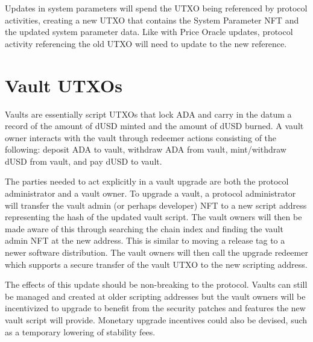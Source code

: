 \documentclass[12pt]{article}
\begin{document}
Updates in system parameters will spend the UTXO being referenced by protocol activities, creating a new UTXO that contains the System Parameter NFT and the updated system parameter data. Like with Price Oracle updates, protocol activity referencing the old UTXO will need to update to the new reference.

\section{Vault UTXOs}

Vaults are essentially script UTXOs that lock ADA and carry in the datum a record of the amount of dUSD minted and the amount of dUSD burned. A vault owner interacts with the vault through redeemer actions consisting of the following: deposit ADA to vault, withdraw ADA from vault, mint/withdraw dUSD from vault, and pay dUSD to vault. 

The parties needed to act explicitly in a vault upgrade are both the protocol administrator and a vault owner. To upgrade a vault, a protocol administrator will transfer the vault admin (or perhaps developer) NFT to a new script address representing the hash of the updated vault script. The vault owners will then be made aware of this through searching the chain index and finding the vault admin NFT at the new address. This is similar to moving a release tag to a newer software distribution. The vault owners will then call the upgrade redeemer which supports a secure transfer of the vault UTXO to the new scripting address.

The effects of this update should be non-breaking to the protocol. Vaults can still be managed and created at older scripting addresses but the vault owners will be incentivized to upgrade to benefit from the security patches and features the new vault script will provide. Monetary upgrade incentives could also be devised, such as a temporary lowering of stability fees.
\end{document}
